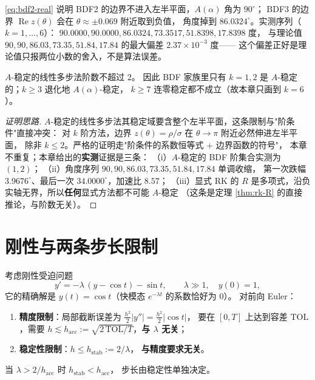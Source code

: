 \begin{corollary}[实测 $A(\alpha)$ 角]
\eqref{eq:bdf2-real} 说明 BDF2 的边界不进入左半平面，$A(\alpha)$ 角为 $90^\circ$；
BDF3 的边界 $\operatorname{Re}z(\theta)$ 会在 $\theta\approx\pm0.069$ 附近取到负值，
角度掉到 $86.0324^\circ$。实测序列（$k=1,\dots,6$）：
$90.0000,90.0000,86.0324,73.3517,51.8398,17.8398$ 度，
与理论值 $90,90,86.03,73.35,51.84,17.84$ 的最大偏差 $2.37\times10^{-3}$ 度——
这个偏差正好是理论值只报两位小数的舍入，不是算法误差。
\end{corollary}

\begin{theorem}
\label{thm:dahlquist}
$A$-稳定的线性多步法阶数不超过 $2$。
因此 BDF 家族里只有 $k=1,2$ 是 $A$-稳定的；$k\ge3$ 退化地 $A(\alpha)$-稳定，
$k\ge7$ 连零稳定都不成立（故本章只画到 $k=6$）。
\end{theorem}

\begin{proof}[证明思路]
$A$-稳定的线性多步法其稳定域要含整个左半平面，这条限制与"阶条件"直接冲突：
对 $k$ 阶方法，边界 $z(\theta)=\rho/\sigma$ 在 $\theta\to\pi$ 附近必然伸进左半平面，
除非 $k\le2$。严格的证明走"阶条件的系数恒等式 + 边界函数的符号"，
本章不重复；本章给出的\textbf{实测}证据是三条：
（i）$A$-稳定的 BDF 阶集合实测为 $(1,2)$；
（ii）角度序列 $90,90,86.03,73.35,51.84,17.84$ 单调收缩，
第一次跌幅 $3.9676^\circ$、最后一次 $34.0000^\circ$，加速比 $8.57$；
（iii）显式 RK 的 $R$ 是多项式，沿负实轴无界，所以\textbf{任何}显式方法都不可能 $A$-稳定
（这条是定理 \ref{thm:rk-R} 的直接推论，与阶数无关）。
\end{proof}

\section{刚性与两条步长限制}

\begin{theorem}[稳定性限制与精度限制的分离]
\label{thm:two-limits}
考虑刚性受迫问题
\begin{equation}
  y'=-\lambda\,(y-\cos t)-\sin t,\qquad \lambda\gg1,\quad y(0)=1,
  \label{eq:stiff-cos}
\end{equation}
它的精确解是 $y(t)=\cos t$（快模态 $e^{-\lambda t}$ 的系数恰好为 $0$）。
对前向 Euler：
\begin{enumerate}
  \item \textbf{精度限制}：局部截断误差为 $\tfrac{h^2}2|y''|=\tfrac{h^2}2|\cos t|$，
        要在 $[0,T]$ 上达到容差 $\mathrm{TOL}$，需要
        $h\lesssim h_{\text{acc}}:=\sqrt{2\,\mathrm{TOL}/T}$，\textbf{与 $\lambda$ 无关}；
  \item \textbf{稳定性限制}：$h\le h_{\text{stab}}:=2/\lambda$，
        \textbf{与精度要求无关}。
\end{enumerate}
当 $\lambda>2/h_{\text{acc}}$ 时 $h_{\text{stab}}<h_{\text{acc}}$，
步长由稳定性单独决定。
\end{theorem}

